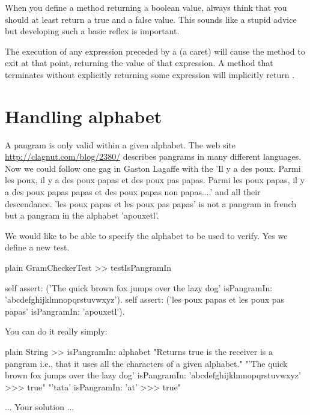 \documentclass[10pt,twoside,english]{_support/latex/sbabook/sbabook}
\begin{document}
\begin{coffee}
When you define a method returning a boolean value, always think that you should at least return a true and a false value. This sounds like a stupid advice but developing such a basic reflex is important.
\end{coffee}

\begin{important}
The execution of any expression preceded by a \textcode{\string^} (a caret) will cause the method to exit at that point, returning the value of that expression. A method that terminates without explicitly returning some expression will implicitly return .
\end{important}
\section{Handling alphabet}
A pangram is only valid within a given alphabet. The web site \url{http://clagnut.com/blog/2380/} describes pangrams in many different languages. Now we could follow one gag in Gaston Lagaffe with the 'Il y a des poux. Parmi les poux, il y a des poux papas et des poux pas papas. Parmi les poux papas, il y a des poux papas papas et des poux papas non papas....' and all their descendance. 
'les poux papas et les poux pas papas' is not a pangram in french but a pangram in the alphabet 'apouxetl'.

We would like to be able to specify the alphabet to be used to verify. Yes we define a new test.

\begin{displaycode}{plain}
GramCheckerTest >> testIsPangramIn

	self assert: ('The quick brown fox jumps over the lazy dog' isPangramIn: 'abcdefghijklmnopqrstuvwxyz').
	self assert: ('les poux papas et les poux pas papas' isPangramIn: 'apouxetl').
\end{displaycode}

You can do it really simply: 

\begin{displaycode}{plain}
String >> isPangramIn: alphabet
	"Returns true is the receiver is a pangram i.e., that it uses all the characters of a given alphabet."
	"'The quick brown fox jumps over the lazy dog' isPangramIn: 'abcdefghijklmnopqrstuvwxyz'
	>>> true"
	"'tata' isPangramIn: 'at'
	>>> true"

	... Your solution ...
\end{displaycode}
\end{document}
